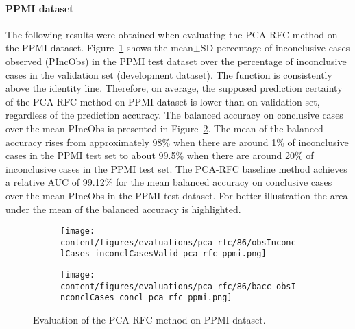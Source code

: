


\paragraph{PPMI dataset}

The following results were obtained when evaluating the PCA-RFC method on the PPMI dataset.
Figure~\ref{fig:obsInconclCases_inconclCasesValid_pca_rfc_ppmi} shows the
mean$\pm$SD percentage of inconclusive cases observed (PIncObs) in the PPMI test dataset 
over the percentage of inconclusive cases in the validation set (development dataset).
The function is consistently above the identity line.
Therefore, on average, the supposed prediction certainty of the PCA-RFC method on PPMI dataset is lower than on validation set,
regardless of the prediction accuracy.
The balanced accuracy on conclusive cases over the mean PIncObs is presented 
in Figure~\ref{fig:bacc_obsInconclCases_concl_pca_rfc_ppmi}.
The mean of the balanced accuracy rises from approximately 98\% 
when there are around 1\% of inconclusive cases in the PPMI test set to about 99.5\% 
when there are around 20\% of inconclusive cases in the PPMI test set.
The PCA-RFC baseline method achieves a relative AUC of 99.12\% for the mean balanced accuracy on conclusive cases 
over the mean PIncObs in the PPMI test dataset.
For better illustration the area under the mean of the balanced accuracy is highlighted.


\begin{figure}[ht]
  \begin{subfigure}{0.9\textwidth}
    \centering
    \texttt{[image: content/figures/evaluations/pca\_rfc/86/obsInconclCases\_inconclCasesValid\_pca\_rfc\_ppmi.png]}
    \label{fig:obsInconclCases_inconclCasesValid_pca_rfc_ppmi}
  \end{subfigure}
  \hfill
  \begin{subfigure}{0.9\textwidth}
    \centering
    \texttt{[image: content/figures/evaluations/pca\_rfc/86/bacc\_obsInconclCases\_concl\_pca\_rfc\_ppmi.png]}
    \label{fig:bacc_obsInconclCases_concl_pca_rfc_ppmi}
  \end{subfigure}
  \caption{Evaluation of the PCA-RFC method on PPMI dataset.}
  \label{fig:perf_results_rfc_ppmi}
\end{figure}



